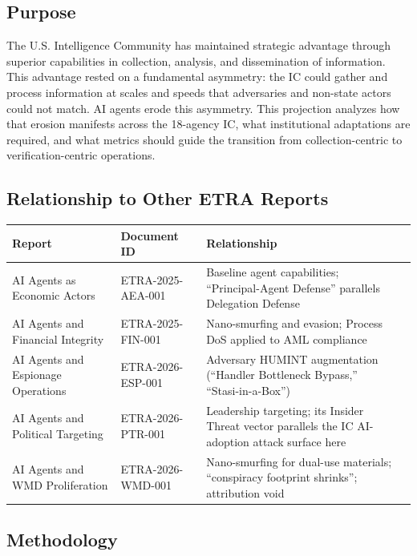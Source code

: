 \documentclass[11pt,letterpaper]{article}
\begin{document}
\subsection{Purpose}

The U.S. Intelligence Community has maintained strategic advantage through superior capabilities in collection, analysis, and dissemination of information. This advantage rested on a fundamental asymmetry: the IC could gather and process information at scales and speeds that adversaries and non-state actors could not match. AI agents erode this asymmetry. This projection analyzes how that erosion manifests across the 18-agency IC, what institutional adaptations are required, and what metrics should guide the transition from collection-centric to verification-centric operations.

\subsection{Relationship to Other ETRA Reports}

\begin{center}
\small
\begin{tabularx}{\linewidth}{ZY{1}Y{0.67}Y{1.33}}
\toprule
\textbf{Report} & \textbf{Document ID} & \textbf{Relationship} \\
\midrule
AI Agents as Economic Actors & ETRA-2025-AEA-001 & Baseline agent capabilities; ``Principal-Agent Defense'' parallels Delegation Defense \\
AI Agents and Financial Integrity & ETRA-2025-FIN-001 & Nano-smurfing and evasion; Process DoS applied to AML compliance \\
AI Agents and Espionage Operations & ETRA-2026-ESP-001 & Adversary HUMINT augmentation (``Handler Bottleneck Bypass,'' ``Stasi-in-a-Box'') \\
AI Agents and Political Targeting & ETRA-2026-PTR-001 & Leadership targeting; its Insider Threat vector parallels the IC AI-adoption attack surface here \\
AI Agents and WMD Proliferation & ETRA-2026-WMD-001 & Nano-smurfing for dual-use materials; ``conspiracy footprint shrinks''; attribution void \\
\bottomrule
\end{tabularx}
\end{center}

\subsection{Methodology}
\end{document}
